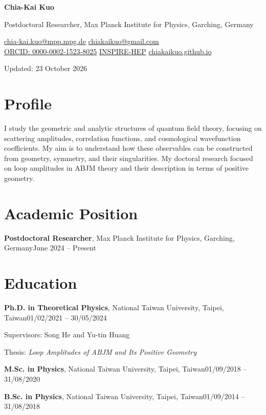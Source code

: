 \documentclass[10pt,a4paper]{article}
\newcommand{\cvdate}[1]{\hfill{\color{muted}#1}}
\newcommand{\role}[3]{\textbf{#1}, #2\cvdate{#3}}
\begin{document}
{\Huge\bfseries Chia-Kai Kuo}

\vspace{4pt}
Postdoctoral Researcher, Max Planck Institute for Physics, Garching, Germany

\vspace{4pt}
\href{mailto:chia-kai.kuo@mpp.mpg.de}{chia-kai.kuo@mpp.mpg.de} \quad
\href{mailto:chiakaikuo@gmail.com}{chiakaikuo@gmail.com} \\
\href{https://orcid.org/0000-0002-1523-8025}{ORCID: 0000-0002-1523-8025} \quad
\href{https://inspirehep.net/authors/1945409?ui-citation-summary=true}{INSPIRE-HEP} \quad
\href{https://chiakaikuo.github.io/}{chiakaikuo.github.io}

{\small\color{muted}Updated: 23 October 2026}

\section{Profile}

I study the geometric and analytic structures of quantum field theory, focusing on scattering amplitudes, correlation functions, and cosmological wavefunction coefficients. My aim is to understand how these observables can be constructed from geometry, symmetry, and their singularities. My doctoral research focused on loop amplitudes in ABJM theory and their description in terms of positive geometry.

\section{Academic Position}

\role{Postdoctoral Researcher}{Max Planck Institute for Physics, Garching, Germany}{June 2024 -- Present}

\section{Education}

\role{Ph.D. in Theoretical Physics}{National Taiwan University, Taipei, Taiwan}{01/02/2021 -- 30/05/2024}

Supervisors: Song He and Yu-tin Huang

Thesis: \textit{Loop Amplitudes of ABJM and Its Positive Geometry}

\role{M.Sc. in Physics}{National Taiwan University, Taipei, Taiwan}{01/09/2018 -- 31/08/2020}

\role{B.Sc. in Physics}{National Taiwan University, Taipei, Taiwan}{01/09/2014 -- 31/08/2018}
\end{document}
